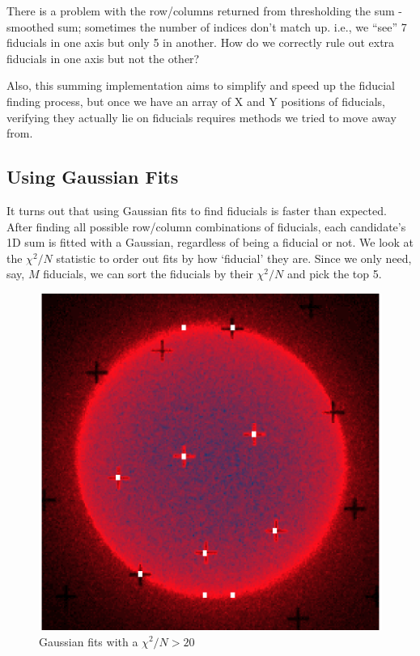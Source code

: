 \documentclass[10pt]{scrartcl}
\begin{document}
There is a problem with the row/columns returned from thresholding the sum - smoothed sum; sometimes the number of indices don't match up. i.e., we ``see'' 7 fiducials in one axis but only 5 in another. How do we correctly rule out extra fiducials in one axis but not the other?

Also, this summing implementation aims to simplify and speed up the fiducial finding process, but once we have an array of X and Y positions of fiducials, verifying they actually lie on fiducials requires methods we tried to move away from. 

\subsection{Using Gaussian Fits} %
\label{sub:using_gaussian_fits}
    It turns out that using Gaussian fits to find fiducials is faster than expected. After finding all possible row/column combinations of fiducials, each candidate's 1D sum is fitted with a Gaussian, regardless of being a fiducial or not. We look at the $\chi^2/N$ statistic to order out fits by how `fiducial' they are. Since we only need, say, $M$ fiducials, we can sort the fiducials by their $\chi^2/N$ and pick the top 5.\\

\begin{figure}
    \centering
    \includegraphics[width=\linewidth]{../plots_tables_images/gfitted.eps}
    \caption{Gaussian fits with a $\chi^2/N > 20$}
\end{figure}
\end{document}
